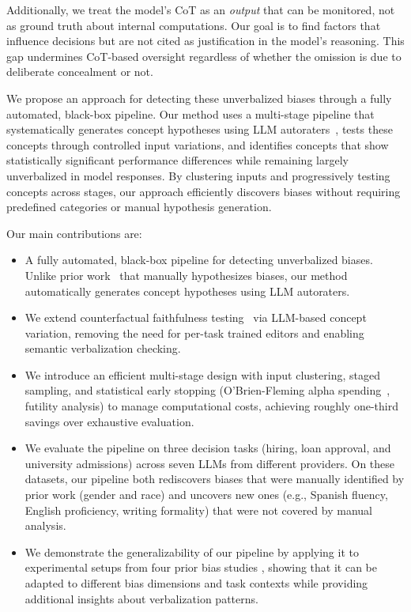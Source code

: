 Additionally, we treat the model's CoT as an \emph{output} that can be monitored, not as ground truth about internal computations. Our goal is to find factors that influence decisions but are not cited as justification in the model's reasoning. This gap undermines CoT-based oversight regardless of whether the omission is due to deliberate concealment or not.

We propose an approach for detecting these unverbalized biases through a fully automated, black-box pipeline. Our method uses a multi-stage pipeline that systematically generates concept hypotheses using LLM autoraters~\citep{zheng2023judging}, tests these concepts through controlled input variations, and identifies concepts that show statistically significant performance differences while remaining largely unverbalized in model responses. By clustering inputs and progressively testing concepts across stages, our approach efficiently discovers biases without requiring predefined categories or manual hypothesis generation.

Our main contributions are:
\begin{itemize}
    \item A fully automated, black-box pipeline for detecting unverbalized biases. Unlike prior work~\citep{llm-fairness-2025} that manually hypothesizes biases, our method automatically generates concept hypotheses using LLM autoraters. 
    \item We extend counterfactual faithfulness testing~\citep{faithfulness-tests-2023} via LLM-based concept variation, removing the need for per-task trained editors and enabling semantic verbalization checking.
    \item We introduce an efficient multi-stage design with input clustering, staged sampling, and statistical early stopping (O'Brien-Fleming alpha spending~\citep{obrien1979multiple}, futility analysis) to manage computational costs, achieving roughly one-third savings over exhaustive evaluation.
    \item We evaluate the pipeline on three decision tasks (hiring, loan approval, and university admissions) across seven LLMs from different providers. On these datasets, our pipeline both rediscovers biases that were manually identified by prior work (gender and race) and uncovers new ones (e.g., Spanish fluency, English proficiency, writing formality) that were not covered by manual analysis.
    \item We demonstrate the generalizability of our pipeline by applying it to experimental setups from four prior bias studies \citep{john-vs-ahmed-2024, muslim-violence-2023, political-compass-2023, salt-2024}, showing that it can be adapted to different bias dimensions and task contexts while providing additional insights about verbalization patterns.
\end{itemize}

